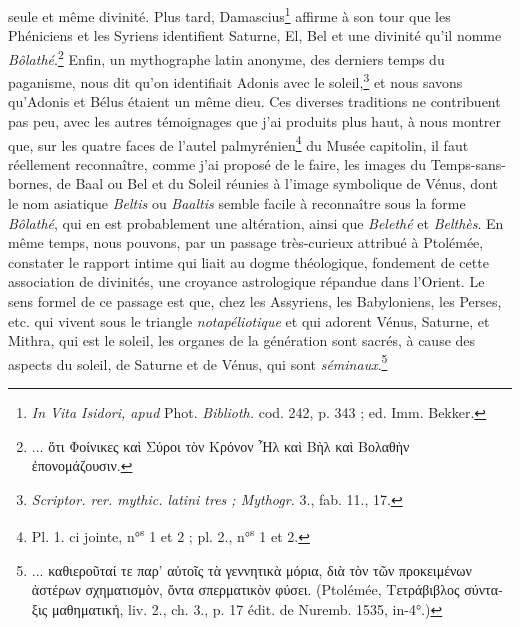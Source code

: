 \documentclass{article}
\begin{document}
seule et même divinité. Plus tard, Damascius\footnote{\emph{In Vita Isidori, apud} Phot. \emph{Biblioth.} cod. 242, p. 343 ; ed. Imm. Bekker.} affirme à son tour que les Phéniciens et les Syriens identifient Saturne, El, Bel et une divinité qu'il nomme \emph{Bôlathé}.\footnote{... \textgreek{ὅτι Φοίνικες καὶ Σύροι τὸν Κρόνον Ἦλ καὶ Βὴλ καὶ Βολαθὴν ἐπονομάζουσιν}.} Enfin, un mythographe latin anonyme, des derniers temps du paganisme, nous dit qu'on identifiait Adonis avec le soleil,\footnote{\emph{Scriptor. rer. mythic. latini tres ; Mythogr.} 3., fab. 11., 17.} et nous savons qu'Adonis et Bélus étaient un même dieu. Ces diverses traditions ne contribuent pas peu, avec les autres témoignages que j'ai produits plus haut, à nous montrer que, sur les quatre faces de l'autel palmyrénien\footnote{Pl. 1. ci jointe, n°\textsuperscript{s} 1 et 2 ; pl. 2., n°\textsuperscript{s} 1 et 2.} du Musée capitolin, il faut réellement reconnaître, comme j'ai proposé de le faire, les images du Temps-sans-bornes, de Baal ou Bel et du Soleil réunies à l'image symbolique de Vénus, dont le nom asiatique \emph{Beltis} ou \emph{Baaltis} semble facile à reconnaître sous la forme \emph{Bôlathé}, qui en est probablement une altération, ainsi que \emph{Belethé} et \emph{Belthès}. En même temps, nous pouvons, par un passage très-curieux attribué à Ptolémée, constater le rapport intime qui liait au dogme théologique, fondement de cette association de divinités, une croyance astrologique répandue dans l'Orient. Le sens formel de ce passage est que, chez les Assyriens, les Babyloniens, les Perses, etc. qui vivent sous le triangle \emph{notapéliotique} et qui adorent Vénus, Saturne, et Mithra, qui est le soleil, les organes de la génération sont sacrés, à cause des aspects du soleil, de Saturne et de Vénus, qui sont \emph{séminaux}.\footnote{... \textgreek{καθιεροῦταί τε παρ' αὐτοῖς τὰ γεννητικὰ μόρια, διὰ τὸν τῶν προκειμένων ἀστέρων σχηματισμὸν, ὄντα σπερματικὸν φύσει}. (Ptolémée, \textgreek{Τετράβιβλος σύνταξις μαθηματική}, liv. 2., ch. 3., p. 17 édit. de Nuremb. 1535, in-4°.)}
\end{document}
